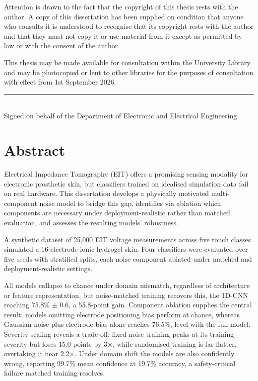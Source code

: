 \documentclass[12pt, a4paper, oneside]{report}
\begin{document}
\vspace{0.5cm}
\noindent Attention is drawn to the fact that the copyright of this thesis rests with the author. A copy of this dissertation has been supplied on condition that anyone who consults it is understood to recognise that its copyright rests with the author and that they must not copy it or use material from it except as permitted by law or with the consent of the author.

\vspace{1cm}
\noindent This thesis may be made available for consultation within the University Library and may be photocopied or lent to other libraries for the purposes of consultation with effect from 1st September 2026.

\vspace{2cm}
\noindent\rule{8cm}{0.4pt}\\
Signed on behalf of the Department of Electronic and Electrical Engineering

\newpage
\chapter*{Abstract}

Electrical Impedance Tomography (EIT) offers a promising sensing modality for electronic prosthetic skin, but classifiers trained on idealised simulation data fail on real hardware. This dissertation develops a physically motivated multi-component noise model to bridge this gap, identifies via ablation which components are necessary under deployment-realistic rather than matched evaluation, and assesses the resulting models' robustness.

A synthetic dataset of 25,000 EIT voltage measurements across five touch classes simulated a 16-electrode ionic hydrogel skin. Four classifiers were evaluated over five seeds with stratified splits, each noise component ablated under matched and deployment-realistic settings.

All models collapse to chance under domain mismatch, regardless of architecture or feature representation, but noise-matched training recovers this, the 1D-CNN reaching 75.8\% $\pm$ 0.6, a 55.8-point gain. Component ablation supplies the central result: models omitting electrode positioning bias perform at chance, whereas Gaussian noise plus electrode bias alone reaches 76.5\%, level with the full model. Severity scaling reveals a trade-off: fixed-noise training peaks at its training severity but loses 15.0 points by 3$\times$, while randomised training is far flatter, overtaking it near 2.2$\times$. Under domain shift the models are also confidently wrong, reporting 99.7\% mean confidence at 19.7\% accuracy, a safety-critical failure matched training resolves.
\end{document}
